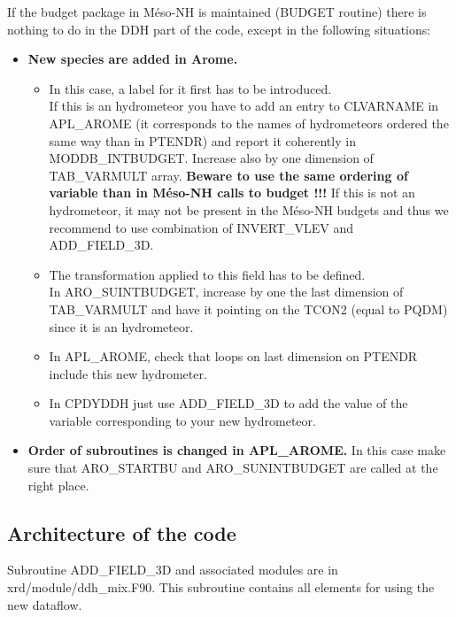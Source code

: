 If the budget package in Méso-NH is maintained (BUDGET routine) 
there is nothing to do in the DDH part of the code, except in the following situations:
\begin{itemize}
 \item \textbf{New species are added in Arome.}  

\begin{itemize}
\item
In this case, a label for it first has to be introduced. \\
If this is an hydrometeor you have to add an entry to CLVARNAME in APL\_AROME (it corresponds to the names of hydrometeors
ordered the same way than in PTENDR) and report it coherently in MODDB\_INTBUDGET. Increase also by one dimension of 
TAB\_VARMULT array. \textbf{Beware to use the same ordering of variable than in Méso-NH calls to budget !!!}
If this is not an hydrometeor, it may not be present in the Méso-NH budgets and thus we recommend to use combination of INVERT\_VLEV  and ADD\_FIELD\_3D.

\item The transformation applied to this field has to be defined. \\
In ARO\_SUINTBUDGET, increase by one the last dimension of TAB\_VARMULT and have it pointing on the
TCON2 (equal to PQDM) since it is an hydrometeor.

\item In APL\_AROME, check that loops on last dimension on PTENDR include this new hydrometer.

\item In CPDYDDH just use ADD\_FIELD\_3D to add the value of the variable corresponding to your new hydrometeor.

\end{itemize}


\item \textbf{Order of subroutines is changed in APL\_AROME.}
In this case make sure that ARO\_STARTBU and ARO\_SUNINTBUDGET are called at the right place.

\end{itemize}


\subsection{Architecture of the code}
\label{archindf}

Subroutine ADD\_FIELD\_3D and associated modules are in xrd/module/ddh\_mix.F90.
This subroutine contains all elements for using the new dataflow.

